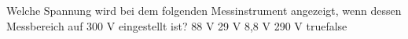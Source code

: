     {Welche Spannung wird bei dem folgenden Messinstrument angezeigt, wenn dessen Messbereich auf 300 V eingestellt ist?}
    {88 V}
    {29 V}
    {8,8 V}
    {290 V}
    {true}{false}